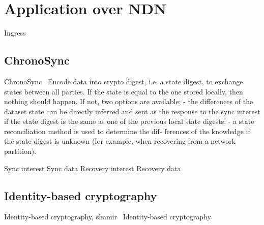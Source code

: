 \chapter{Application over \gls{NDN}}
Ingress


\section{ChronoSync}
ChronoSync~\cite{DBLP:conf/icnp/ZhuA13}
Encode data into crypto digest, i.e. a state digest, to exchange states between all parties. 
If the state is equal to the one stored locally, then nothing should happen.
If not, two options are available; 
- the differences of the dataset state can be directly inferred
and sent as the response to the sync interest if the state
digest is the same as one of the previous local state
digests;
- a state reconciliation method is used to determine the dif-
ferences of the knowledge if the state digest is unknown
(for example, when recovering from a network partition).

Sync interest
Sync data
Recovery interest
Recovery data

\section{Identity-based cryptography}
Identity-based cryptography, shamir~\cite{DBLP:conf/crypto/Shamir84}
Identity-based cryptography~\cite{DBLP:conf/icnp/ZhangCXWSW11}
